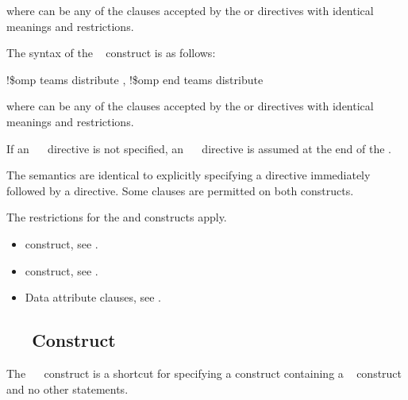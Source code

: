 where  can be any of the clauses accepted by the  or  
directives with identical meanings and restrictions.
\ccppspecificend

\fortranspecificstart
The syntax of the ~ construct is as follows:

\begin{boxedcode}
!\$omp teams distribute \plc{[clause[ [},\plc{] clause] ... ]}
\plc{[}!\$omp end teams distribute\plc{]}
\end{boxedcode}

where  can be any of the clauses accepted by the  or  
directives with identical meanings and restrictions.

If an ~~ directive is not specified, an 
~~ directive is assumed at the end of the .
\fortranspecificend

\descr
The semantics are identical to explicitly specifying a  directive immediately 
followed by a  directive. Some clauses are permitted on both constructs.

\restrictions
The restrictions for the  and  constructs apply.

\crossreferences
\begin{itemize}
\item {} construct, see 
.

\item {} construct, see 
.

\item Data attribute clauses, see 
.
\end{itemize}












\subsection{~~ Construct}
\label{subsec:teams distribute simd Construct}
\summary
The ~~ construct is a shortcut for specifying a  construct 
containing a ~ construct and no other statements.

